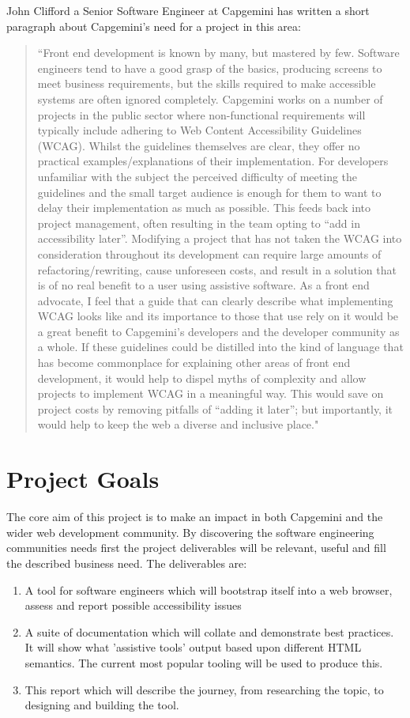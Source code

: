 John Clifford a Senior Software Engineer at Capgemini has written a short
paragraph about Capgemini's need for a project in this area:
\begin{quotation}
``Front end development is known by many, but mastered by few. Software
engineers tend to have a good grasp of the basics, producing screens to meet
business requirements, but the skills required to make accessible systems are
often ignored completely.
Capgemini works on a number of projects in the public sector where
non-functional requirements will typically include adhering to Web Content
Accessibility Guidelines (WCAG). Whilst the guidelines themselves are clear,
they offer no practical examples/explanations of their implementation. For
developers unfamiliar with the subject the perceived difficulty of meeting the
guidelines and the small target audience is enough for them to want to delay
their implementation as much as possible. This feeds back into project
management, often resulting in the team opting to “add in accessibility later”.
Modifying a project that has not taken the WCAG into consideration throughout
its development can require large amounts of refactoring/rewriting, cause
unforeseen costs, and result in a solution that is of no real benefit to a user
using assistive software.
As a front end advocate, I feel that a guide that can clearly describe what
implementing WCAG looks like and its importance to those that use rely on it
would be a great benefit to Capgemini’s developers and the developer community
as a whole. If these guidelines could be distilled into the kind of language
that has become commonplace for explaining other areas of front end
development, it would help to dispel myths of complexity and allow projects to
implement WCAG in a meaningful way. This would save on project costs by
removing pitfalls of “adding it later”; but importantly, it would help to keep
the web a diverse and inclusive place."
\end{quotation}

\section{Project Goals}
The core aim of this project is to make an impact in both Capgemini and the
wider web development community. By discovering the software
engineering communities needs first
the project deliverables will be relevant, useful and fill the described
business need. The deliverables are:
\begin{enumerate}
  \item A tool for software engineers which will bootstrap itself into a web
browser, assess and report possible accessibility issues
  \item A suite of documentation which will collate and demonstrate best
practices. It will show what 'assistive tools' output based upon different
HTML semantics. The current most popular tooling will be used to produce this.
  \item This report which will describe the journey, from researching the
topic, to designing and building the tool.
\end{enumerate}

